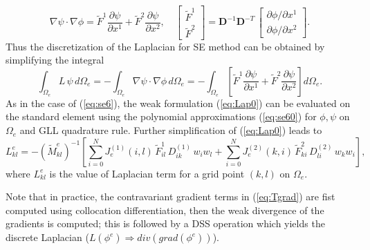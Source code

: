 \documentclass{agujournal}
\begin{document}
 \begin{equation}
    \nabla \psi \cdot \nabla \phi  = \tilde{F}^1  \frac{\partial \psi}{ \partial x^1} +
      \tilde{F}^2  \frac{\partial \psi}{ \partial x^2} , \quad 
     \left[   \begin{array}{c}
               \tilde{F}^1  \\     \tilde{F}^2
             \end{array}
           \right]
           =
     \mathbf{D}^{-1}  \mathbf{D}^{-T}   \, \left[   \begin{array}{c}
                \partial \phi / \partial x^1  \\ \partial \phi / \partial x^2 
             \end{array}
           \right] 
           \label{eq:Tgrad}.
  \end{equation}
Thus the discretization of the Laplacian for SE method can be obtained by simplifying the integral 
%
 \begin{equation}
   \int_{\Omega_e}  L \, \psi  \,  d \Omega_e  = -   \int_{\Omega_e}  \nabla \psi \cdot \nabla \phi \,  d \Omega_e
    = -  \int_{\Omega_e} \left[  \tilde{F}^1  \frac{\partial \psi}{ \partial x^1} +
      \tilde{F}^2  \frac{\partial \psi}{ \partial x^2}  \right]    d \Omega_e.  \label{eq:Lap0}
  \end{equation}
 As in the case of  (\ref{eq:se6}),  the weak formulation (\ref{eq:Lap0})  can be evaluated  on the standard element   
  using    the polynomial approximations (\ref{eq:se60}) for $\phi, \psi$ on $\Omega_e$ and GLL quadrature rule.
   Further simplification of (\ref{eq:Lap0})  leads to 
   \begin{equation}
     L^e_{kl} =  - ( \widetilde M^e_{kl})^{-1} \left[ 
           \sum_{i=0}^N  J^{(1)}_e(i,l) \,  \tilde{F}^1_{i l} \, D_{ik}^{(1)}\, w_i  w_l  +
           \sum_{i=0}^N  J^{(2)}_e(k, i) \,  \tilde{F}^2_{k i} \, D_{l i}^{(2)} \, w_k  w_i  \right], 
           \label{eq:Lap1}
   \end{equation}
 where $L^e_{kl}$ is the value of Laplacian term for a grid point $(k,l)$ on $\Omega_e$.  
 
 
   Note that in practice,
 the contravariant gradient terms in  (\ref{eq:Tgrad}) are fist  computed using collocation differentiation,   
 then  the weak  divergence of the gradients   is computed;    this is followed by a  DSS operation which 
 yields the discrete Laplacian ($ L(\phi^e)  \Rightarrow  div(grad(\phi^e))$). 
 
\end{document}

